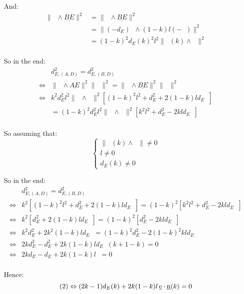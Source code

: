 \documentclass[10pt,a4paper]{article}
\newcommand{\ud}[1]{\underline{#1}}
\DeclareMathOperator{\cross}{\wedge}
\DeclareMathOperator{\AD}{\ud{AD}}
\DeclareMathOperator{\BD}{\ud{BD}}
\DeclareMathOperator{\ED}{\ud{ED}}
\DeclareMathOperator{\e}{\ud{e}}
\DeclareMathOperator{\n}{\ud{n}}
\DeclareMathOperator{\en}{\ud{e}\cdot\ud{n}}
\begin{document}
And:
$$
\begin{array}{lll}
    \| \BD \cross \ud{BE} \|^2
    & = \| \ED \cross \ud{BE} \|^2\\
    & = \| (-d_E)\n \cross (1-k)l(-\e) \|^2\\
    & = (1-k)^2d_E(k)^2l^2 \| \n(k) \cross \e \|^2\\
\end{array}
$$

So in the end:
$$
\begin{array}{lll}
    & d_{E, (A,D)}^2 = d_{E, (B,D)}^2\\
    \Leftrightarrow &
    \| \AD \cross \ud{AE} \|^2 \| \BD \|^2
    = \| \BD \cross \ud{BE} \|^2 \| \AD \|^2\\
    \Leftrightarrow &
    k^2d_E^2l^2 \| \n \cross \e \|^2
    \left[ (1-k)^2l^2 + d_E^2 + 2 (1-k)ld_E \en \right]\\
    & = (1-k)^2d_E^2l^2 \| \n \cross \e \|^2
    \left[ k^2l^2 + d_E^2 - 2 kld_E \en \right]\\
\end{array}
$$

So assuming that:
$$
\left\{
    \begin{array}{ll}
        \| \n(k) \cross \e \| \neq 0\\
        l \neq 0\\
        d_E(k) \neq 0
    \end{array}
\right.
$$

So in the end:
$$
\begin{array}{lll}
    & d_{E, (A,D)}^2 = d_{E, (B,D)}^2\\
    \Leftrightarrow &
    k^2 \left[ (1-k)^2l^2 + d_E^2 + 2 (1-k)ld_E \en \right]
    = (1-k)^2 \left[ k^2l^2 + d_E^2 - 2 kld_E \en \right]\\
    \Leftrightarrow &
    k^2 \left[ d_E^2 + 2 (1-k)ld_E \en \right]
    = (1-k)^2 \left[ d_E^2 - 2 kld_E \en \right]\\
    \Leftrightarrow &
    k^2d_E^2 + 2 k^2(1-k)ld_E \en
    = (1-k)^2d_E^2 - 2(1-k)^2kld_E \en\\
    \Leftrightarrow &
    2kd_E^2 - d_E^2 + 2k(1-k)ld_E\en(k + 1 - k) = 0\\
    \Leftrightarrow &
    2kd_E - d_E + 2k(1-k)l\en = 0\\
\end{array}
$$

Hence:
$$
(2) \Leftrightarrow (2k - 1)d_E(k) + 2k(1-k)l\en(k) = 0\\
$$
\end{document}
